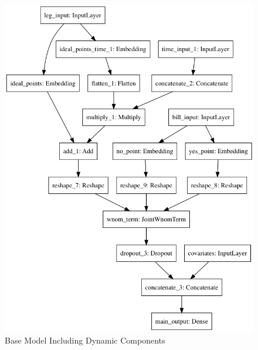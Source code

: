 \documentclass[11pt,]{article}
\begin{document}
\begin{figure}

{\centering \includegraphics[width=0.75\linewidth]{model_dynamic}

}

\caption{\label{fig:modeldynamic}Base Model Including Dynamic Components}\label{fig:unnamed-chunk-13}
\end{figure}

\clearpage




\newpage
\singlespacing

\end{document}
